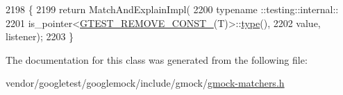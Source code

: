 \begin{DoxyCode}
2198                                                                             \{
2199     \textcolor{keywordflow}{return} MatchAndExplainImpl(
2200         typename ::testing::internal::
2201             is\_pointer<\hyperlink{gtest-internal_8h_a2ffec8c60510eb130af387f5ce9a756a}{GTEST\_REMOVE\_CONST\_}(T)>::\hyperlink{namespaceupload_a4fc56f0dd6613be15c3c4dc3af3619ce}{type}(),
2202         value, listener);
2203   \}
\end{DoxyCode}


The documentation for this class was generated from the following file\+:\begin{DoxyCompactItemize}
\item 
vendor/googletest/googlemock/include/gmock/\hyperlink{gmock-matchers_8h}{gmock-\/matchers.\+h}\end{DoxyCompactItemize}

